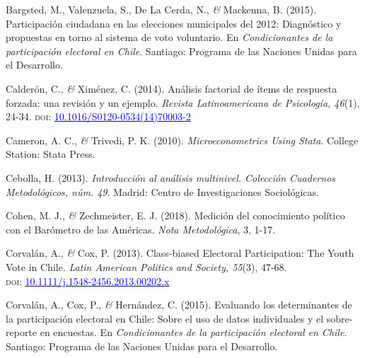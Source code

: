 \documentclass[a4paper]{tufte-handout}
\begin{document}
{{{{{{{{{{{{{\begin{list}{}
\item{\small Bargsted, M., Valenzuela, S., De La Cerda, N., {\itshape \&} Mackenna, B. (2015). Participación ciudadana en las elecciones municipales del 2012: Diagnóstico y propuestas en torno al sistema de voto voluntario. En {\itshape Condicionantes de la participación electoral en Chile}. Santiago: Programa de las Naciones Unidas para el Desarrollo.}

\item{\small Calderón, C., {\itshape \&} Ximénez, C. (2014). Análisis factorial de ítems de respuesta forzada: una revisión y un ejemplo. {\itshape Revista Latinoamericana de Psicología, 46}(1), 24-34. {\scshape doi:} \href{https://doi.org/10.1016/S0120-0534(14)70003-2}{\textcolor{blue}{10.1016/S0120-0534(14)70003-2}}}

\item{\small Cameron, A. C., {\itshape \&} Trivedi, P. K. (2010). {\itshape Microeconometrics Using Stata}. College Station: Stata Press.}

\item{\small Cebolla, H. (2013). {\itshape Introducción al análisis multinivel. Colección Cuadernos Metodológicos, núm. 49}. Madrid: Centro de Investigaciones Sociológicas.}


\item{\small Cohen, M. J., {\itshape \&} Zechmeister, E. J. (2018). Medición del conocimiento político con el Barómetro de las Américas. {\itshape Nota Metodológica}, 3, 1-17.}

\item{\small Corvalán, A., {\itshape \&} Cox, P. (2013). Class-biased Electoral Participation: The Youth Vote in Chile. {\itshape Latin American Politics and Society, 55}(3), 47-68. \\ {\scshape doi:} \href{https://doi.org/10.1111/j.1548-2456.2013.00202.x}{\textcolor{blue}{10.1111/j.1548-2456.2013.00202.x}}}

\item{\small Corvalán, A., Cox, P., {\itshape \&} Hernández, C. (2015). Evaluando los determinantes de la participación electoral en Chile: Sobre el uso de datos individuales y el sobre-reporte en encuestas. En {\itshape Condicionantes de la participación electoral en Chile}. Santiago: Programa de las Naciones Unidas para el Desarrollo.}


\end{list}}}}}}}}}}}}}}
\end{document}
